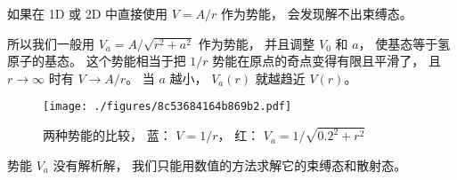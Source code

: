 

如果在 1D 或 2D 中直接使用 $V = A/r$ 作为势能， 会发现解不出束缚态。

所以我们一般用 $V_a = A/\sqrt{r^2 + a^2}$ 作为势能， 并且调整 $V_0$ 和 $a$， 使基态等于氢原子的基态。 这个势能相当于把 $1/r$ 势能在原点的奇点变得有限且平滑了， 且 $r\to\infty$ 时有 $V \to A/r$。 当 $a$ 越小， $V_a(r)$ 就越趋近 $V(r)$。

\begin{figure}[ht]
\centering
\texttt{[image: ./figures/8c53684164b869b2.pdf]}
\caption{两种势能的比较， 蓝： $V = 1/r$， 红： $V_a = 1/\sqrt{0.2^2 + r^2}$} \label{fig_Hy1D2D_1}
\end{figure}

势能 $V_a$ 没有解析解， 我们只能用数值的方法求解它的束缚态和散射态。
